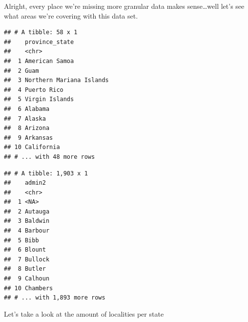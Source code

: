 \documentclass[
]{article}
\newenvironment{Shaded}{\begin{snugshade}}{\end{snugshade}}
\newcommand{\CommentTok}[1]{\textcolor[rgb]{0.56,0.35,0.01}{\textit{#1}}}
\newcommand{\DataTypeTok}[1]{\textcolor[rgb]{0.13,0.29,0.53}{#1}}
\newcommand{\DecValTok}[1]{\textcolor[rgb]{0.00,0.00,0.81}{#1}}
\newcommand{\KeywordTok}[1]{\textcolor[rgb]{0.13,0.29,0.53}{\textbf{#1}}}
\newcommand{\NormalTok}[1]{#1}
\newcommand{\OperatorTok}[1]{\textcolor[rgb]{0.81,0.36,0.00}{\textbf{#1}}}
\newcommand{\OtherTok}[1]{\textcolor[rgb]{0.56,0.35,0.01}{#1}}
\newcommand{\StringTok}[1]{\textcolor[rgb]{0.31,0.60,0.02}{#1}}
\begin{document}
Alright, every place we're missing more granular data makes
sense\ldots well let's see what areas we're covering with this data set.

\begin{Shaded}
\end{Shaded}

\begin{verbatim}
## # A tibble: 58 x 1
##    province_state          
##    <chr>                   
##  1 American Samoa          
##  2 Guam                    
##  3 Northern Mariana Islands
##  4 Puerto Rico             
##  5 Virgin Islands          
##  6 Alabama                 
##  7 Alaska                  
##  8 Arizona                 
##  9 Arkansas                
## 10 California              
## # ... with 48 more rows
\end{verbatim}

\begin{Shaded}
\end{Shaded}

\begin{verbatim}
## # A tibble: 1,903 x 1
##    admin2  
##    <chr>   
##  1 <NA>    
##  2 Autauga 
##  3 Baldwin 
##  4 Barbour 
##  5 Bibb    
##  6 Blount  
##  7 Bullock 
##  8 Butler  
##  9 Calhoun 
## 10 Chambers
## # ... with 1,893 more rows
\end{verbatim}

Let's take a look at the amount of localities per state

\begin{Shaded}
\end{Shaded}
\end{document}
